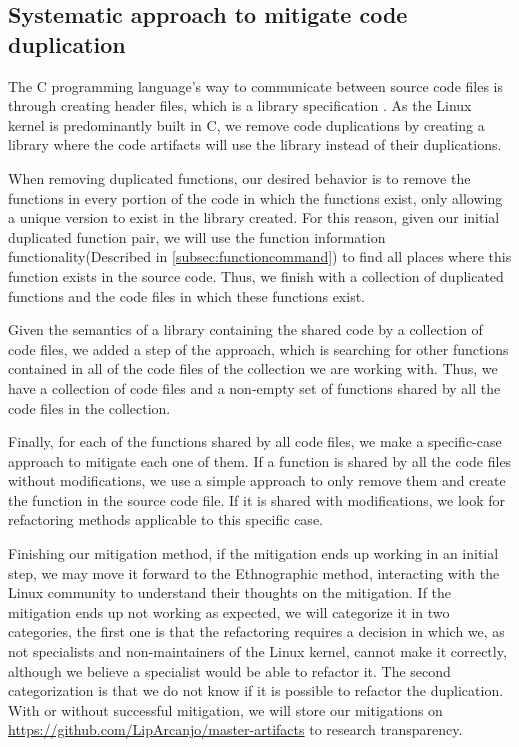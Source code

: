 \subsection{Systematic approach to mitigate code duplication}

\label{subsec:pipeline}

The C programming language’s way to communicate between source code files is through creating 
header files, which is a library specification \citep{Cbook}. As the Linux kernel 
is predominantly built in C, we remove code duplications by creating a library where the code 
artifacts will use the library instead of their duplications.

When removing duplicated functions, our desired behavior is to remove the functions in every 
portion of the code in which the functions exist, only allowing a unique version to exist in 
the library created. For this reason, given our initial duplicated function pair, we will use 
the function information functionality(Described in \ref{subsec:functioncommand}) to find all
places where this function exists in the source code. Thus, we finish with a collection of 
duplicated functions and the code files in which these functions exist.

Given the semantics of a library containing the shared code by a collection of code files, 
we added a step of the approach, which is searching for other functions contained in all of 
the code files of the collection we are working with. Thus, we have a collection of code files 
and a non-empty set of functions shared by all the code files in the collection.

Finally, for each of the functions shared by all code files, we make a specific-case approach 
to mitigate each one of them. If a function is shared by all the code files without 
modifications, we use a simple approach to only remove them and create the function in the 
source code file. If it is shared with modifications, we look for refactoring methods applicable 
to this specific case.

Finishing our mitigation method, if the mitigation ends up working in an initial step, we may 
move it forward to the Ethnographic method, interacting with the Linux community to understand 
their thoughts on the mitigation. If the mitigation ends up not working as expected, we will 
categorize it in two categories, the first one is that the refactoring requires a decision in 
which we, as not specialists and non-maintainers of the Linux kernel, cannot make it correctly,
although we believe a specialist would be able to refactor it. The second categorization is 
that we do not know if it is possible to refactor the duplication. With or without successful 
mitigation, we will store our mitigations on \url{https://github.com/LipArcanjo/master-artifacts} 
to research transparency.

